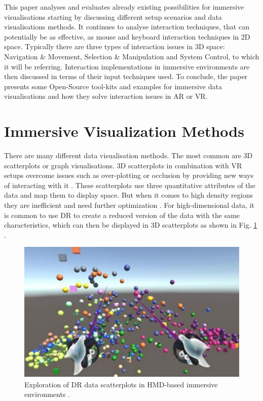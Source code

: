 This paper analyses and evaluates already existing possibilities for immersive visualisations starting by discussing different setup scenarios and data visualisations methods. It continues to analyse interaction techniques, that can potentially be as effective, as mouse and keyboard interaction techniques in 2D space. Typically there are three types of interaction issues in 3D space: Navigation \& Movement, Selection \& Manipulation and System Control, to which it will be referring. 
Interaction implementations in immersive environments are then discussed in terms of their input techniques used. 
To conclude, the paper presents some Open-Source tool-kits and examples for immersive data visualisations and how they solve interaction issues in \ac{AR} or \ac{VR}.

\section{Immersive Visualization Methods}
\label{section:ivm}
There are many different data visualisation methods. The most common are 3D scatterplots or graph visualisations. 3D scatterplots in combination with \ac{VR} setups overcome issues such as over-plotting or occlusion by providing new ways of interacting with it \autocite[]{Prouzeau2019}. These scatterplots use three quantitative attributes of the data and map them to display space. But when it comes to high density regions they are inefficient and need further optimization \autocite[]{Prouzeau2019}.
For high-dimensional data, it is common to use \ac{DR} to create a reduced version of the data with the same characteristics, which can then be displayed in 3D scatterplots as shown in Fig. \ref{figure:DR3DScatterplots} \autocite[484]{WagnerFilho2018}.
\begin{figure}[!ht]
    \centering
	\includegraphics[width=0.5 \textwidth]{images/Filho2020_controllers_interaction_scatterplots.jpg}
	\caption{
		Exploration of \ac{DR} data scatterplots in HMD-based immersive environments \autocite{WagnerFilho2018}.
	}
	\label{figure:DR3DScatterplots}
\end{figure}
